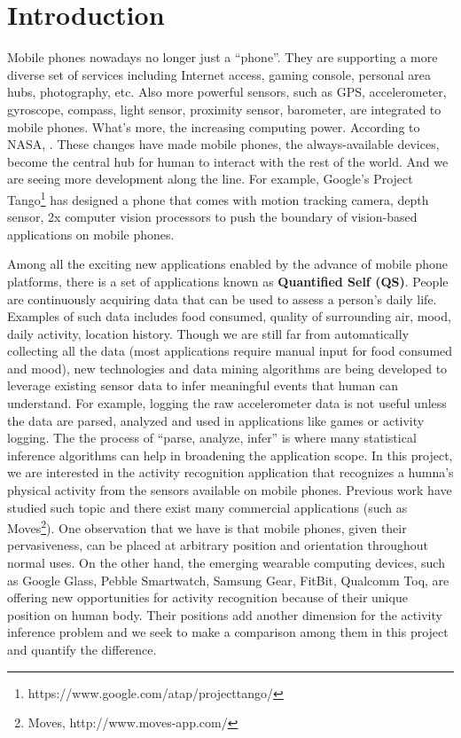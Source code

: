 \section{Introduction}
\label{sec:introduction}

Mobile phones nowadays no longer just a ``phone''. They are supporting a more diverse set of services including Internet access, gaming console, personal area hubs, photography, etc. Also more powerful sensors, such as GPS, accelerometer, gyroscope, compass, light sensor, proximity sensor, barometer, are integrated to mobile phones. What's more, the increasing computing power. According to NASA, . These changes have made mobile phones, the always-available devices, become the central hub for human to interact with the rest of the world. And we are seeing more development along the line. For example, Google's Project Tango\footnote{https://www.google.com/atap/projecttango/} has designed a phone that comes with motion tracking camera, depth sensor, 2x computer vision processors to push the boundary of vision-based applications on mobile phones.

Among all the exciting new applications enabled by the advance of mobile phone platforms, there is a set of applications known as {\bf Quantified Self (QS)}\cite{wolf2010quantified}. People are continuously acquiring data that can be used to assess a person's daily life. Examples of such data includes food consumed, quality of surrounding air, mood, daily activity, location history. Though we are still far from automatically collecting all the data (most applications require manual input for food consumed and mood), new technologies and data mining algorithms are being developed to leverage existing sensor data to infer meaningful events that human can understand. For example, logging the raw accelerometer data is not useful unless the data are parsed, analyzed and used in applications like games or activity logging. The the process of ``parse, analyze, infer'' is where many statistical inference algorithms can help in broadening the application scope. In this project, we are interested in the activity recognition application that recognizes a humna's physical activity from the sensors available on mobile phones. Previous work \cite{ravi2005activity, kwapisz2011activity, lee2011activity} have studied such topic and there exist many commercial applications (such as Moves\footnote{Moves, http://www.moves-app.com/}). One observation that we have is that mobile phones, given their pervasiveness, can be placed at arbitrary position and orientation throughout normal uses. On the other hand, the emerging wearable computing devices, such as Google Glass, Pebble Smartwatch, Samsung Gear, FitBit, Qualcomm Toq, are offering new opportunities for activity recognition because of their unique position on human body. Their positions add another dimension for the activity inference problem and we seek to make a comparison among them in this project and quantify the difference.

